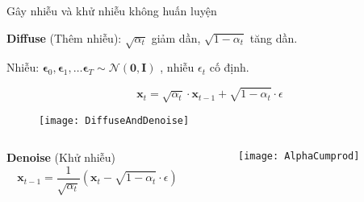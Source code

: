 
\begin{frame}{Gây nhiễu và khử nhiễu không huấn luyện}
    
    \textbf{Diffuse} (Thêm nhiễu): $\sqrt{\alpha_t}$ giảm dần, $\sqrt{1 - \alpha_t}$ tăng dần.
    
    Nhiễu:  $\boldsymbol{\epsilon}_{0}, \boldsymbol{\epsilon}_{1}, \dots \boldsymbol{\epsilon}_{T} \sim \mathcal{N}(\mathbf{0}, \mathbf{I})$ , nhiễu $\epsilon_t$ cố định.
    
    \begin{equation}
        \mathbf{x}_t=\sqrt{\alpha_t} \cdot \mathbf{x}_{t-1}+\sqrt{1 - \alpha_t} \cdot \epsilon
    \end{equation}
    \vspace{-15pt}
    
    \begin{figure}
        \centering
        \texttt{[image: DiffuseAndDenoise]}
    \end{figure}
    
    \begin{columns}
        \begin{column}{0.5\textwidth}
        	\vspace{-10pt}
            \textbf{Denoise} (Khử nhiễu)
            \begin{equation}
                \mathbf{x}_{t-1} = \frac{1}{\sqrt{\alpha_{t}}} (\mathbf{x}_t - \sqrt{1- \alpha_t} \cdot \epsilon)
            \end{equation}
        \end{column}
        \begin{column}{0.5\textwidth}
        \begin{figure}
            \centering
			\texttt{[image: AlphaCumprod]}
        \end{figure}
        \end{column}
    \end{columns}
    
    \end{frame}
